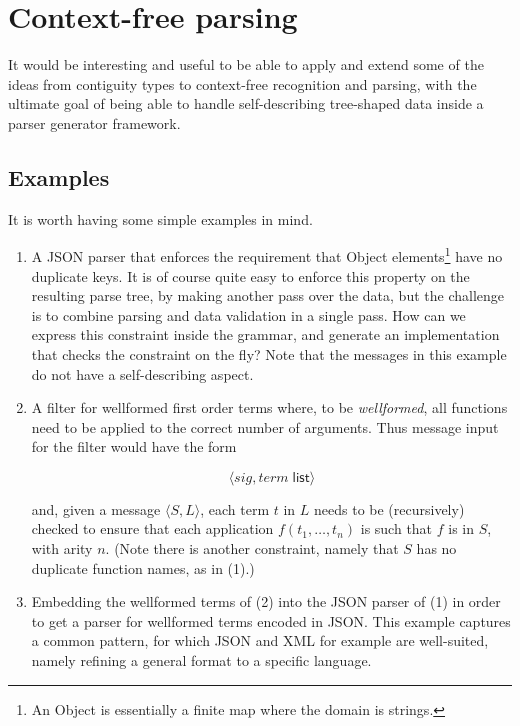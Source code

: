 \documentclass{article}
\newcommand{\konst}[1]{\ensuremath{\mathsf{#1}}}
\begin{document}
\section{Context-free parsing}

 It would be interesting and useful to be able to apply and extend
 some of the ideas from contiguity types to context-free recognition
 and parsing, with the ultimate goal of being able to handle
 self-describing tree-shaped data inside a parser generator
 framework.

 \subsection{Examples}

It is worth having some simple examples in mind.

\begin{enumerate}

\item A JSON parser that enforces the requirement that \textsf{Object}
  elements\footnote{An \textsf{Object} is essentially a finite map
    where the domain is strings.} have no duplicate keys. It is of
  course quite easy to enforce this property on the resulting parse
  tree, by making another pass over the data, but the challenge is to
  combine parsing and data validation in a single pass. How can we
  express this constraint inside the grammar, and generate an
  implementation that checks the constraint on the fly? Note that the
  messages in this example do not have a self-describing aspect.

\item A filter for wellformed first order terms where, to be
  \emph{wellformed}, all functions need to be applied to the correct number
  of arguments. Thus message input for the filter would have the form

  \[ \langle \mathit{sig} , \mathit{term}\; \konst{list} \rangle \]

  and, given a message $\langle S, L \rangle$, each term $t$ in $L$
  needs to be (recursively) checked to ensure that each application
  $f(t_1,\ldots,t_n)$ is such that $f$ is in $S$, with arity $n$.
  (Note there is another constraint, namely that $S$ has no duplicate
  function names, as in (1).)

\item Embedding the wellformed terms of (2) into the JSON parser
  of (1) in order to get a parser for wellformed terms encoded in
  JSON. This example captures a common pattern, for which JSON and XML
  for example are well-suited, namely refining a general format to a
  specific language.

\end{enumerate}
\end{document}
